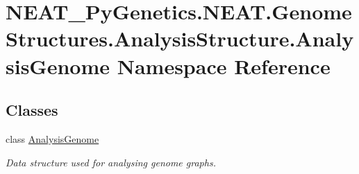 \hypertarget{namespaceNEAT__PyGenetics_1_1NEAT_1_1GenomeStructures_1_1AnalysisStructure_1_1AnalysisGenome}{}\section{N\+E\+A\+T\+\_\+\+Py\+Genetics.\+N\+E\+A\+T.\+Genome\+Structures.\+Analysis\+Structure.\+Analysis\+Genome Namespace Reference}
\label{namespaceNEAT__PyGenetics_1_1NEAT_1_1GenomeStructures_1_1AnalysisStructure_1_1AnalysisGenome}
\subsection*{Classes}
\begin{DoxyCompactItemize}
\item 
class \hyperlink{classNEAT__PyGenetics_1_1NEAT_1_1GenomeStructures_1_1AnalysisStructure_1_1AnalysisGenome_1_1AnalysisGenome}{Analysis\+Genome}
\begin{DoxyCompactList}\small\item\em Data structure used for analysing genome graphs. \end{DoxyCompactList}\end{DoxyCompactItemize}
